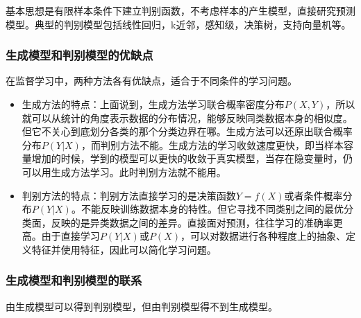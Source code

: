 基本思想是有限样本条件下建立判别函数，不考虑样本的产生模型，直接研究预测模型。典型的判别模型包括线性回归，k近邻，感知级，决策树，支持向量机等。

\subsubsection{生成模型和判别模型的优缺点}
在监督学习中，两种方法各有优缺点，适合于不同条件的学习问题。

\begin{itemize}
	\item 生成方法的特点：上面说到，生成方法学习联合概率密度分布$P(X,Y)$，所以就可以从统计的角度表示数据的分布情况，能够反映同类数据本身的相似度。但它不关心到底划分各类的那个分类边界在哪。生成方法可以还原出联合概率分布$P(Y|X)$，而判别方法不能。生成方法的学习收敛速度更快，即当样本容量增加的时候，学到的模型可以更快的收敛于真实模型，当存在隐变量时，仍可以用生成方法学习。此时判别方法就不能用。
	\item 判别方法的特点：判别方法直接学习的是决策函数$Y=f(X)$或者条件概率分布$P(Y|X)$。不能反映训练数据本身的特性。但它寻找不同类别之间的最优分类面，反映的是异类数据之间的差异。直接面对预测，往往学习的准确率更高。由于直接学习$P(Y|X)$或$P(X)$，可以对数据进行各种程度上的抽象、定义特征并使用特征，因此可以简化学习问题。
	\end{itemize}


\subsubsection{生成模型和判别模型的联系}
由生成模型可以得到判别模型，但由判别模型得不到生成模型。
